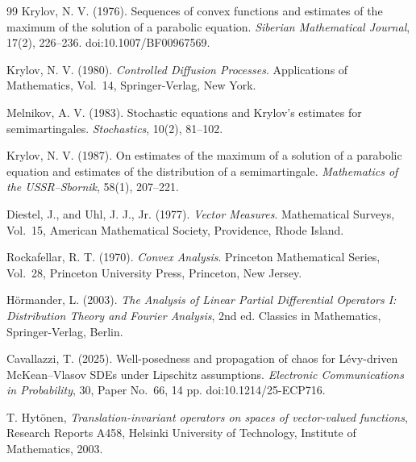 \documentclass[12pt,oneside, reqno]{amsart}
\numberwithin{equation}{section}
\begin{document}
\begin{thebibliography}{99}
		Krylov, N. V. (1976). Sequences of convex functions and estimates of
		the maximum of the solution of a parabolic equation.
		{\it Siberian Mathematical Journal}, 17(2), 226--236.
		doi:10.1007/BF00967569.
		
		
		Krylov, N. V. (1980).
		{\it Controlled Diffusion Processes}.
		Applications of Mathematics, Vol.~14,
		Springer-Verlag, New York.
		
		Melnikov, A. V. (1983). Stochastic equations and Krylov's estimates for semimartingales. {\it Stochastics}, 10(2), 81--102.
		
		Krylov, N. V. (1987). On estimates of the maximum of a solution of a parabolic equation and estimates of the distribution of a semimartingale. {\it Mathematics of the USSR--Sbornik}, 58(1), 207--221.
		
		Diestel, J., and Uhl, J. J., Jr. (1977).
		{\it Vector Measures}.
		Mathematical Surveys, Vol.~15,
		American Mathematical Society, Providence, Rhode Island.
		
		
		
		
		
		
		Rockafellar, R. T. (1970).
		{\it Convex Analysis}.
		Princeton Mathematical Series, Vol.~28,
		Princeton University Press, Princeton, New Jersey.
		
		H\"ormander, L. (2003).
		{\it The Analysis of Linear Partial Differential Operators I:
			Distribution Theory and Fourier Analysis}, 2nd ed.
		Classics in Mathematics,
		Springer-Verlag, Berlin.
		
		
		Cavallazzi, T. (2025). Well-posedness and propagation of chaos for
		L\'evy-driven McKean--Vlasov SDEs under Lipschitz assumptions.
		{\it Electronic Communications in Probability}, 30, Paper No.~66, 14 pp.
		doi:10.1214/25-ECP716.
		
		T. Hyt\"onen,
		\emph{Translation-invariant operators on spaces of vector-valued functions},
		Research Reports A458,
		Helsinki University of Technology, Institute of Mathematics, 2003.
	\end{thebibliography}
	
\end{document}
